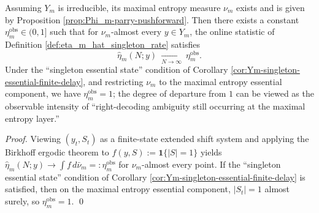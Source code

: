 \begin{proposition}\label{prop:eta_m_hat_ergodic_limit}
Assuming \(Y_m\) is irreducible, its maximal entropy measure \(\nu_m\) exists and is given by Proposition \ref{prop:Phi_m-parry-pushforward}. Then there exists a constant \(\eta_m^{\mathrm{obs}}\in(0,1]\) such that for \(\nu_m\)-almost every \(y\in Y_m\), the online statistic of Definition \ref{def:eta_m_hat_singleton_rate} satisfies
\[
\widehat\eta_m(N;y)\ \xrightarrow[N\to\infty]{}\ \eta_m^{\mathrm{obs}}.
\]
Under the ``singleton essential state'' condition of Corollary \ref{cor:Ym-singleton-essential-finite-delay}, and restricting \(\nu_m\) to the maximal entropy essential component, we have \(\eta_m^{\mathrm{obs}}=1\); the degree of departure from \(1\) can be viewed as the observable intensity of ``right-decoding ambiguity still occurring at the maximal entropy layer.''
\end{proposition}
\begin{proof}
Viewing \((y_t,S_t)\) as a finite-state extended shift system and applying the Birkhoff ergodic theorem to \(f(y,S):=\mathbf{1}\{|S|=1\}\) yields
\(
\widehat\eta_m(N;y)\to \int f\,d\bar\nu_m=:\eta_m^{\mathrm{obs}}
\)
for \(\nu_m\)-almost every point.
If the ``singleton essential state'' condition of Corollary \ref{cor:Ym-singleton-essential-finite-delay} is satisfied, then on the maximal entropy essential component, \(|S_t|=1\) almost surely, so \(\eta_m^{\mathrm{obs}}=1\). \qed
\end{proof}

